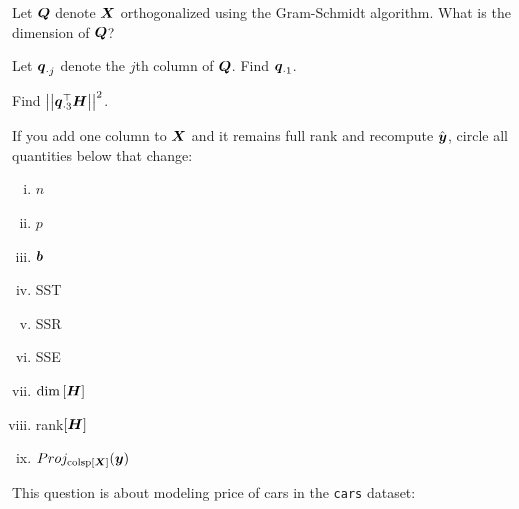 \documentclass[12pt]{article}
\begin{document}
 Let $\boldsymbol{Q}$ denote $\boldsymbol{X}$ orthogonalized using the Gram-Schmidt algorithm. What is the dimension of $\boldsymbol{Q}$?

 Let $\boldsymbol{q}_{\cdot j}$ denote the $j$th column of $\boldsymbol{Q}$. Find $\boldsymbol{q}_{\cdot 1}$. 


 Find $\left|\left|\boldsymbol{q}_{\cdot 3}^\top\boldsymbol{H}\right|\right|^2$. 

 If you add one column to $\boldsymbol{X}$ and it remains full rank and recompute $\hat{\boldsymbol{y}}$, circle all quantities below that change:


\begin{enumerate}[i)]
\item $n$
\item $p$
\item $\boldsymbol{b}$
\item SST
\item SSR
\item SSE
\item $\dim\left[\boldsymbol{H}\right]$
\item rank$\left[\boldsymbol{H}\right]$
\item $Proj_{\text{colsp}\left[\boldsymbol{X}\right]}(\boldsymbol{y})$
\end{enumerate}

\eenum

\problem This question is about modeling price of cars in the \texttt{cars} dataset:
\end{document}
